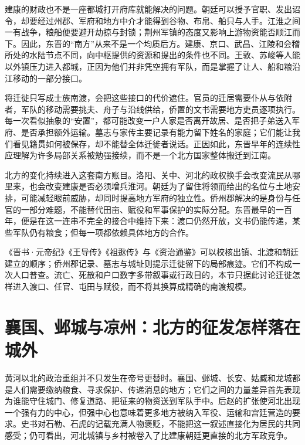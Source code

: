 建康的财政也不是一座都城打开府库就能解决的问题。朝廷可以授予官职、发出诏令，却要经过州郡、军府和地方中介才能得到谷物、布帛、船只与人手。江淮之间一有战争，粮船便要避开劫掠与封锁；荆州军镇的态度又影响上游物资能否顺江而下。因此，东晋的“南方”从来不是一个均质后方。建康、京口、武昌、江陵和会稽所处的水陆节点不同，向中枢提供的资源和提出的条件也不同。王敦、苏峻等人能以外镇压力进入都城，正因为他们并非凭空拥有军队，而是掌握了让人、船和粮沿江移动的一部分接口。

将迁徙只写成士族南渡，会把这些接口的代价遮住。官员的迁居需要仆从与依附者，军队的移动需要挑夫、舟子与沿线供给，侨置的文书需要地方吏员逐项执行。每一次看似抽象的“安置”，都可能改变一户人家是否离开故居、是否把子弟送入军府、是否承担额外运输。墓志与家传主要记录有能力留下姓名的家庭；它们能让我们看见籍贯如何被保存，却不能替全体迁徙者说话。正因如此，东晋早年的连续性应理解为许多局部关系被勉强接续，而不是一个北方国家整体搬迁到江南。

北方的变化持续进入这套南方账目。洛阳、关中、河北的政权换手会改变流民从哪里来，也会改变建康是否必须增兵淮河。朝廷为了留住将领而给出的名位与土地安排，可能减轻眼前威胁，却同时提高地方军府的独立性。侨州郡解决的是身份与任官的一部分难题，不能替代田亩、赋役和军事保护的实际分配。东晋最早的一百年，便是在这一连串不完全的接合中维持下来：渡口仍然开放，文书仍能传递，某些军队仍有粮食；但每一项都依赖具体地方的合作。

\begin{sourcenote}[南渡的名目不能换算成总人数]
《晋书·元帝纪》《王导传》《祖逖传》与《资治通鉴》可以校核出镇、北渡和朝廷建立的顺序；侨州郡记录、墓志与城址则提示迁徙留下的局部痕迹。它们不构成一次人口普查。流亡、死散和户口数字多带叙事或行政目的，本节只据此讨论迁徙怎样进入渡口、任官、屯田与赋役，而不将其换算成精确的南渡规模。
\end{sourcenote}

\section{襄国、邺城与凉州：北方的征发怎样落在城外}
\label{sec:eastern-jin-depth-northern-regimes}

黄河以北的政治重组并不只发生在帝号更替时。襄国、邺城、长安、姑臧和龙城都是人们需要缴纳粮食、寻求保护、传递消息的地方；它们之间的力量差异首先表现为谁能守住城门、修复道路、把征来的物资送到军队手中。后赵的扩张使河北出现一个强有力的中心，但强中心也意味着更多地方被纳入军役、运输和宫廷营造的要求。史书对石勒、石虎的记载充满人物褒贬，不能把这一叙述直接化为居民的共同感受；仍可看出，河北城镇与乡村被卷入了比建康朝廷更直接的北方军政竞争。

